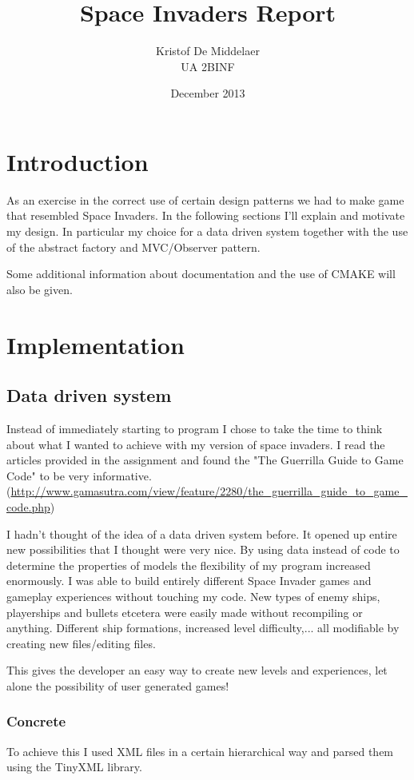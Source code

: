 \documentclass[11pt, a4paper]{article}
\begin{document}
\title{Space Invaders Report}
\author{Kristof De Middelaer\\ UA 2BINF}
\date{December 2013}
\maketitle

\section{Introduction}
As an exercise in the correct use of certain design patterns we had to make game that resembled Space Invaders.
In the following sections I'll explain and motivate my design. In particular my choice for a data driven system together with the use of the
abstract factory and MVC/Observer pattern.

Some additional information about documentation and the use of CMAKE will also be given.

\section{Implementation}
\subsection{Data driven system}
Instead of immediately starting to program I chose to take the time to think about what I wanted to achieve with my version of space invaders.
I read the articles provided in the assignment and found the "The Guerrilla Guide to Game Code" to be very informative. (\url{http://www.gamasutra.com/view/feature/2280/the_guerrilla_guide_to_game_code.php})

I hadn't thought of the idea of a data driven system before. It opened up entire new possibilities that I thought were very nice.
By using data instead of code to determine the properties of models the flexibility of my program increased enormously.
I was able to build entirely different Space Invader games and gameplay experiences without touching my code.
New types of enemy ships, playerships and bullets etcetera were easily made without recompiling or anything.
Different ship formations, increased level difficulty,... all modifiable by creating new files/editing files.

This gives the developer an easy way to create new levels and experiences, let alone the possibility of user generated games!
\subsubsection{Concrete}
To achieve this I used XML files in a certain hierarchical way and parsed them using the TinyXML library.
\end{document}
